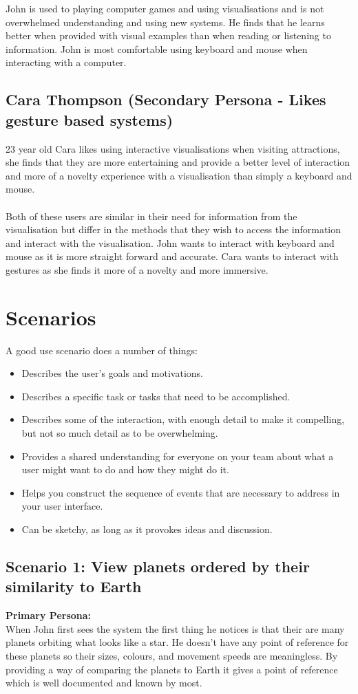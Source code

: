 John is used to playing computer games and using visualisations and is not overwhelmed understanding and using new systems. He finds that he learns better when provided with visual examples than when reading or listening to information. John is most comfortable using keyboard and mouse when interacting with a computer.
\subsection{Cara Thompson (Secondary Persona - Likes gesture based systems)}
23 year old Cara likes using interactive visualisations when visiting attractions, she finds that they are more entertaining and provide a better level of interaction and more of a novelty experience with a visualisation than simply a keyboard and mouse. 
\\\\
Both of these users are similar in their need for information from the visualisation but differ in the methods that they wish to access the information and interact with the visualisation. John wants to interact with keyboard and mouse as it is more straight forward and accurate. Cara wants to interact with gestures as she finds it more of a novelty and more immersive.
\section{Scenarios}
 A good use scenario does a number of things:
\begin{itemize}
 \item Describes the user's goals and motivations.
  \item Describes a specific task or tasks that need to be accomplished.
   \item Describes some of the interaction, with enough detail to make it compelling, but not so much detail as to be overwhelming.
    \item Provides a shared understanding for everyone on your team about what a user might want to do and how they might do it.
     \item Helps you construct the sequence of events that are necessary to address in your user interface.
     \item Can be sketchy, as long as it provokes ideas and discussion.
\end{itemize}
 \subsection{Scenario 1: View planets ordered by their similarity to Earth}
   {\bf Primary Persona:}\\
 When John first sees the system the first thing he notices is that their are many planets orbiting what looks like a star. He doesn't have any point of reference for these planets so their sizes, colours, and movement speeds are meaningless. By providing a way of comparing the planets to Earth it gives a point of reference which is well documented and known by most.
 
